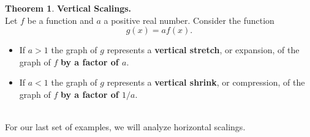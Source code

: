 \documentclass[11pt]{book}
\theoremstyle{definition}  %
\newtheorem{thm}{Theorem}[chapter] %
\newcommand{\bbm}{\begin{boxedminipage}{4.80in}} %
\newcommand{\ebm}{\end{boxedminipage}}
\begin{document}
\bbm
\begin{thm} \label{vscalings}\textbf{Vertical Scalings.}\\
Let $f$ be a function and $a$ a positive real number.  Consider the function
$$g(x)=af(x).$$
\begin{itemize}
\item If $a > 1$ the graph of $g$ represents a \textbf{vertical stretch}, or expansion, of the graph of $f$ \textbf{by a factor of $a$}. 
\item If $a < 1$ the graph of $g$ represents a \textbf{vertical shrink}, or compression, of the graph of $f$ \textbf{by a factor of $1/a$}.
\end{itemize}
\end{thm}
\ebm

\smallskip
~\\
For our last set of examples, we will analyze horizontal scalings.
\end{document}
